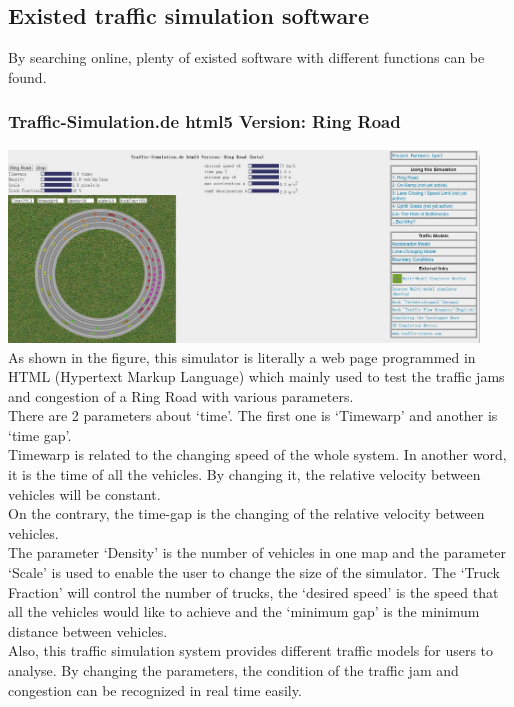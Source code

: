 \documentclass[a4paper,12pt]{article}
\begin{document}
\subsection{Existed traffic simulation software}
By searching online, plenty of existed software with different functions can be found.\\
\subsubsection{Traffic-Simulation.de html5 Version: Ring Road}
\includegraphics[width=12.5cm]{RingRoad.eps}\\
As shown in the figure, this simulator is literally a web page programmed in HTML (Hypertext Markup Language) which mainly used to test the traffic jams and congestion of a Ring Road with various parameters.\\
There are 2 parameters about ‘time’. The first one is ‘Timewarp’ and another is ‘time gap’.\\
Timewarp is related to the changing speed of the whole system. In another word, it is the time of all the vehicles. By changing it, the relative velocity between vehicles will be constant.\\
On the contrary, the time-gap is the changing of the relative velocity between vehicles.\\
The parameter ‘Density’ is the number of vehicles in one map and the parameter ‘Scale’ is used to enable the user to change the size of the simulator. The ‘Truck Fraction’ will control the number of trucks, the ‘desired speed’ is the speed that all the vehicles would like to achieve and the ‘minimum gap’ is the minimum distance between vehicles.\\
Also, this traffic simulation system provides different traffic models for users to analyse. By changing the parameters, the condition of the traffic jam and congestion can be recognized in real time easily.\\
\end{document}
